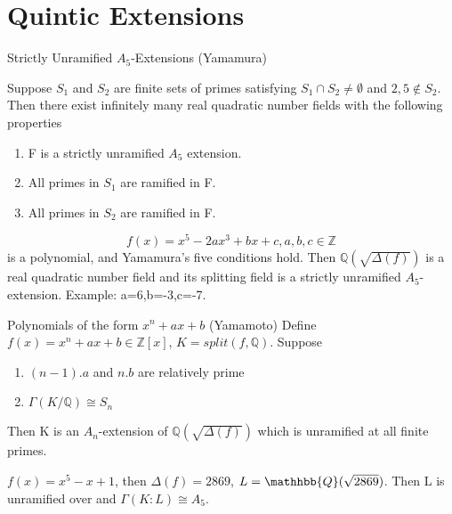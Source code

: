 \documentclass[10pt]{beamer}
\newcommand{\q}{\mathbb{Q}}
\newcommand{\lb}{\left(}
\newcommand{\rb}{\right)}
\theoremstyle{plain} %
\begin{document}
\section{Quintic Extensions}
\begin{frame}{Strictly Unramified $A_5$-Extensions (Yamamura)}
    \begin{theorem}
    Suppose $S_1$ and $S_2$ are finite sets of primes satisfying $S_1 \cap S_2 \neq \emptyset$ and $2,5 \notin S_2$. Then there exist infinitely many real quadratic number fields with the following properties \begin{enumerate}
        \item F is a strictly unramified $A_5$ extension.
        \item All primes in $S_1$ are ramified in F.
        \item All primes in $S_2$ are ramified in F.
    \end{enumerate}
\end{theorem}\begin{example}
\begin{equation}
    f(x)=x^5-2ax^3+bx+c, a,b,c \in \mathbb{Z}
\end{equation} is a polynomial, and Yamamura's five conditions hold. Then $\q\lb\sqrt{\Delta\lb f\rb}\rb$ is a real quadratic number field and its splitting field is a strictly unramified $A_5$-extension. Example: a=6,b=-3,c=-7.
\end{example}
\end{frame}
\begin{frame}{Polynomials of the form $x^n+ax+b$ (Yamamoto)}
Define $ f(x) = x^n+ax+b \in \mathbb{Z}[x]$,
$K=split(f,\mathbb{Q})$. 
Suppose
\begin{enumerate}
    \item $(n-1).a$ and $n.b$ are relatively prime 
    \item $\Gamma(K/\mathbb{Q}) \cong S_n$
\end{enumerate}\par
Then K is an $A_n$-extension of $\mathbb{Q}(\sqrt{\Delta(f)})$ which is unramified at all finite primes. \begin{example}
$f(x) = x^5-x+1$, then $\Delta(f)= 2869$, $L = \mathhbb{Q}(\sqrt{2869})$. Then L is unramified over  and $\Gamma(K:L)\cong A_5.$
\end{example}  
\end{frame}
\end{document}
